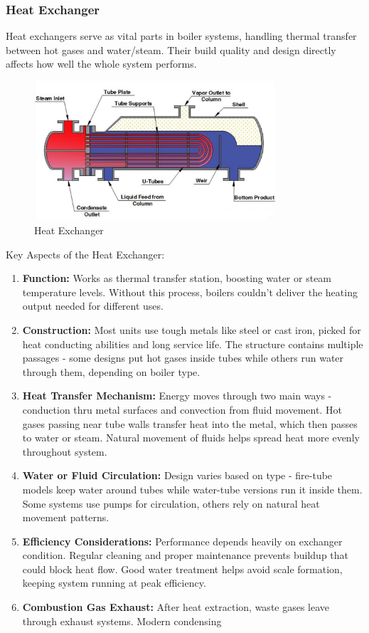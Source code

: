 \subsubsection{Heat Exchanger}
Heat exchangers serve as vital parts in boiler systems, handling thermal transfer between hot gases and water/steam. Their build quality and design directly affects how well the whole system performs.
\begin{figure}[h]
\centering
\includegraphics[width=0.8\textwidth]{figs/lastmin/heat_exchanger.png}
\caption{Heat Exchanger}
\label{fig:heat_exchanger}
\end{figure}
Key Aspects of the Heat Exchanger:
\begin{enumerate}
    \item \textbf{Function:} Works as thermal transfer station, boosting water or steam temperature levels. Without this process, boilers couldn't deliver the heating output needed for different uses.
    \item \textbf{Construction:} Most units use tough metals like steel or cast iron, picked for heat conducting abilities and long service life. The structure contains multiple passages - some designs put hot gases inside tubes while others run water through them, depending on boiler type.
    \item \textbf{Heat Transfer Mechanism:} Energy moves through two main ways - conduction thru metal surfaces and convection from fluid movement. Hot gases passing near tube walls transfer heat into the metal, which then passes to water or steam. Natural movement of fluids helps spread heat more evenly throughout system.
    \item \textbf{Water or Fluid Circulation:} Design varies based on type - fire-tube models keep water around tubes while water-tube versions run it inside them. Some systems use pumps for circulation, others rely on natural heat movement patterns.
    \item \textbf{Efficiency Considerations:} Performance depends heavily on exchanger condition. Regular cleaning and proper maintenance prevents buildup that could block heat flow. Good water treatment helps avoid scale formation, keeping system running at peak efficiency.
    \item \textbf{Combustion Gas Exhaust:} After heat extraction, waste gases leave through exhaust systems. Modern condensing 
\end{enumerate}

